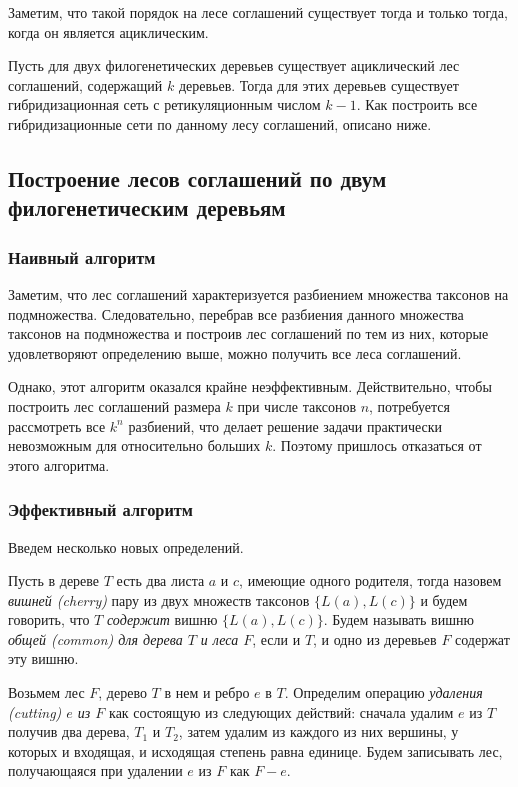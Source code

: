 \documentclass[14pt]{matmex-diploma-custom}
\begin{document}
        Заметим, что такой порядок на лесе соглашений существует тогда и только тогда, когда
        он является ациклическим.
        
        Пусть для двух филогенетических деревьев существует ациклический лес соглашений, содержащий $k$ деревьев. Тогда для этих деревьев существует гибридизационная сеть с ретикуляционным числом $k - 1$. Как построить все гибридизационные сети по данному лесу соглашений, описано ниже.
    \subsection{Построение лесов соглашений по двум филогенетическим деревьям}
    \subsubsection{Наивный алгоритм}
        Заметим, что лес соглашений характеризуется разбиением множества таксонов на подмножества. Следовательно, перебрав все разбиения данного множества таксонов на подмножества и построив лес соглашений по тем из них, которые удовлетворяют определению выше, можно получить все леса соглашений.
        
        Однако, этот алгоритм оказался крайне неэффективным. Действительно, чтобы построить лес соглашений размера $k$ при числе таксонов $n$, потребуется рассмотреть все $k^n$ разбиений, что делает решение задачи практически невозможным для относительно больших $k$. Поэтому пришлось отказаться от этого алгоритма.
    \subsubsection{Эффективный алгоритм}
        Введем несколько новых определений.
    
        Пусть в дереве $T$ есть два листа $a$ и $c$, имеющие одного родителя, тогда назовем \textit{вишней (cherry)} пару из двух множеств таксонов $\{L(a), L(c)\}$ и будем говорить, что $T$ \textit{содержит} вишню $\{L(a), L(c)\}$. Будем называть вишню  \textit{общей (common) для дерева $T$ и леса $F$}, если и $T$, и одно из деревьев $F$ содержат эту вишню.
        
        Возьмем лес $F$, дерево $T$ в нем и ребро $e$ в $T$. Определим операцию \textit{удаления (cutting) $e$ из $F$} как состоящую из следующих действий: сначала удалим $e$ из $T$ получив два дерева, $T_1$ и $T_2$, затем удалим из каждого из них вершины, у которых и входящая, и исходящая степень равна единице. Будем записывать лес, получающаяся при удалении $e$ из $F$ как $F-e$.
        
\end{document}
